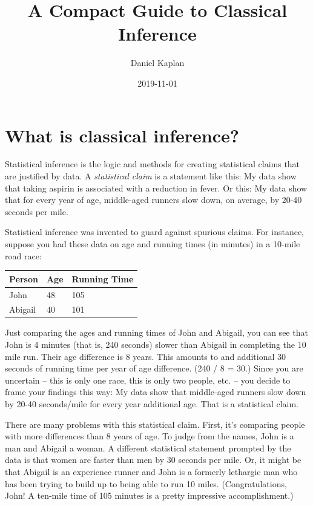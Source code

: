 \documentclass[]{book}
\title{A Compact Guide to Classical Inference}
\author{Daniel Kaplan}
\date{2019-11-01}
\begin{document}
\maketitle

{
\setcounter{tocdepth}{1}
\tableofcontents
}
\hypertarget{what-is-classical-inference}{%
\chapter{What is classical inference?}\label{what-is-classical-inference}}

Statistical inference is the logic and methods for creating statistical claims that are justified by data. A \emph{statistical claim} is a statement like this: My data show that taking aspirin is associated with a reduction in fever. Or this: My data show that for every year of age, middle-aged runners slow down, on average, by 20-40 seconds per mile.

Statistical inference was invented to guard against spurious claims. For instance, suppose you had these data on age and running times (in minutes) in a 10-mile road race:

\begin{longtable}[]{@{}lll@{}}
\toprule
Person & Age & Running Time\tabularnewline
\midrule
\endhead
John & 48 & 105\tabularnewline
Abigail & 40 & 101\tabularnewline
\bottomrule
\end{longtable}

Just comparing the ages and running times of John and Abigail, you can see that John is 4 minutes (that is, 240 seconds) slower than Abigail in completing the 10 mile run. Their age difference is 8 years. This amounts to and additional 30 seconds of running time per year of age difference. (240 / 8 = 30.) Since you are uncertain -- this is only one race, this is only two people, etc. -- you decide to frame your findings this way: My data show that middle-aged runners slow down by 20-40 seconds/mile for every year additional age. That is a statistical claim.

There are many problems with this statistical claim. First, it's comparing people with more differences than 8 years of age. To judge from the names, John is a man and Abigail a woman. A different statistical statement prompted by the data is that women are faster than men by 30 seconds per mile. Or, it might be that Abigail is an experience runner and John is a formerly lethargic man who has been trying to build up to being able to run 10 miles. (Congratulations, John! A ten-mile time of 105 minutes is a pretty impressive accomplishment.)
\end{document}
